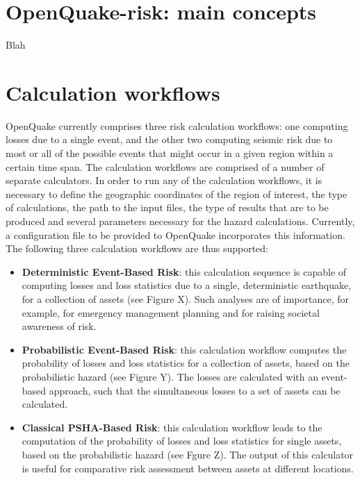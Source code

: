 %
\section{OpenQuake-risk: main concepts}
Blah
%
\section{Calculation workflows}
OpenQuake currently comprises three risk calculation workflows: one computing losses due to a single event, and the other two computing seismic risk due to most or all of the possible events that might occur in a given region within a certain time span. The calculation workflows are comprised of a number of separate calculators. In order to run any of the calculation workflows, it is necessary to define the geographic coordinates of the region of interest, the type of calculations, the path to the input files, the type of results that are to be produced and several parameters necessary for the hazard calculations. Currently, a configuration file to be provided to OpenQuake incorporates this information.
The following three calculation workflows are thus supported:
\begin{itemize}
\item \textbf{Deterministic Event-Based Risk}: this calculation sequence is capable of computing losses and loss statistics due to a single,
deterministic earthquake, for a collection of assets (see Figure X). Such analyses are of importance, for example, for emergency management planning and for raising societal awareness of risk. 
\item \textbf{Probabilistic Event-Based Risk}: this calculation workflow computes the probability of losses and loss statistics for a collection of
assets, based on the probabilistic hazard (see Figure Y). The losses are calculated with an event-based approach,
such that the simultaneous losses to a set of assets can be calculated.
\item \textbf{Classical PSHA-Based Risk}: this calculation workflow leads to the computation of the probability of losses and loss statistics for
single assets, based on the probabilistic hazard (see Fgure Z). The output of this calculator is useful for
comparative risk assessment between assets at different locations.
\end{itemize}


